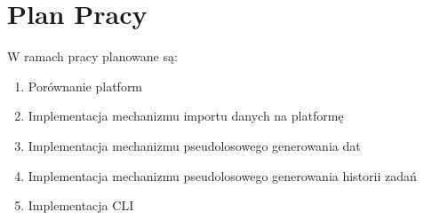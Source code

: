 \section{Plan Pracy}
W ramach pracy planowane są:
\begin{enumerate}
    \item Porównanie platform
    \item Implementacja mechanizmu importu danych na platformę
    \item Implementacja mechanizmu pseudolosowego generowania dat
    \item Implementacja mechanizmu pseudolosowego generowania historii zadań
    \item Implementacja CLI
\end{enumerate}
